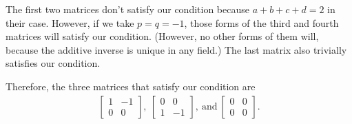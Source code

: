 \documentclass[12pt]{article}
\begin{document}
\begin{enumerate}
      The first two matrices don't satisfy our condition because
      $a + b + c + d = 2$ in their case. However, if we take $p =
      q = -1$, those forms of the third and fourth matrices will
      satisfy our condition. (However, no other forms of them
      will, because the additive inverse is unique in any field.)
      The last matrix also trivially satisfies our condition.

      Therefore, the three matrices that satisfy our condition
      are
      \begin{align*}
        \begin{bmatrix}
           1 & -1\\
           0 & 0
        \end{bmatrix},\ 
        \begin{bmatrix}
           0 & 0\\
           1 & -1
        \end{bmatrix},\ \text{and}\ 
        \begin{bmatrix}
           0 & 0\\
           0 & 0
        \end{bmatrix}.
      \end{align*}

\end{enumerate}
\end{document}
